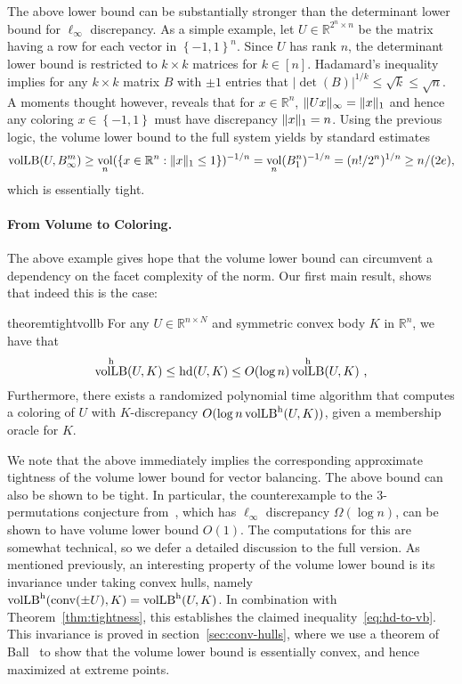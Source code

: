 \documentclass[11pt]{article}
\newcommand{\R}{{\mathbb{R}}}
\newcommand{\set}[1]{\left\{ #1 \right\}}
\DeclareMathOperator{\vollb}{volLB}
\DeclareMathOperator{\hd}{hd}
\DeclareMathOperator{\vol}{vol}
\DeclareMathOperator{\conv}{conv}
\DeclarePairedDelimiter\norm{\lVert}{\rVert}
\begin{document}
The above lower bound can be substantially stronger than the determinant lower
bound for $\ell_\infty$ discrepancy. As a simple example, let $U \in \R^{2^n
\times n}$ be the matrix having a row for each vector in $\set{-1,1}^n$. Since
$U$ has rank $n$, the determinant lower bound is restricted to $k \times k$
matrices for $k \in [n]$. Hadamard's inequality implies for any $k \times k$
matrix $B$ with $\pm 1$ entries that $|\det(B)|^{1/k} \leq \sqrt{k} \leq
\sqrt{n}$. A moments thought however, reveals that for $x \in \R^n$,
$\norm{Ux}_\infty = \norm{x}_1$ and hence any coloring $x \in \set{-1,1}$ must
have discrepancy $\norm{x}_1 = n$. Using the previous logic, the volume lower
bound to the full system yields by standard estimates
\[
\vollb(U,B^m_\infty) \geq \vol_n(\set{x \in \R^n: \norm{x}_1 \leq 1})^{-1/n}
= \vol_n(B_1^n)^{-1/n} = (n!/2^n)^{1/n} \geq n/(2e), 
\]
which is essentially tight. 

\paragraph{\bf From Volume to Coloring.} The above example gives hope that the
volume lower bound can circumvent a dependency on the facet complexity of
the norm. Our first main result, shows that indeed this is the case:

\begin{restatable}{theorem}{tightvollb} 
\label{thm:tightness}
For any $U \in \R^{n \times N}$ and symmetric convex body $K$ in $\R^n$, we have that
\begin{equation}
\label{eq:tightness}
\vollb^{\rm h}(U,K) \leq \hd(U,K) \leq O(\log n) \vollb^{\rm h}(U,K) \text{ ,}
\end{equation}
Furthermore, there exists a randomized polynomial time algorithm that computes a
coloring of $U$ with $K$-discrepancy $O(\log n \vollb^{\rm h}(U,K))$, given a
membership oracle for $K$. 
\end{restatable}

We note that the above immediately implies the corresponding approximate
tightness of the volume lower bound for vector balancing. The above bound can
also be shown to be tight. In particular, the counterexample to the
3-permutations conjecture from~\cite{NNN12}, which has $\ell_\infty$ discrepancy
$\Omega(\log n)$, can be shown to have volume lower bound $O(1)$. The
computations for this are somewhat technical, so we defer a detailed discussion
to the full version. As mentioned previously, an interesting property of the
volume lower bound is its invariance under taking convex hulls, namely $\vollb^{\rm
h}(\conv(\pm U),K) = \vollb^{\rm h}(U,K)$. In combination with
Theorem~\ref{thm:tightness}, this establishes the claimed
inequality~\ref{eq:hd-to-vb}. This invariance is proved in
section~\ref{sec:conv-hulls}, where we use a theorem of Ball~\cite{Ball88} to
show that the volume lower bound is essentially convex, and hence maximized at
extreme points.
\end{document}
